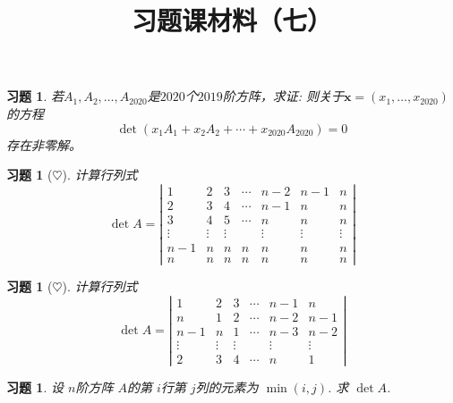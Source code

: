\documentclass[UTF8]{ctexart}
\newtheorem{ex}[thm]{习题}
\begin{document}
\title{习题课材料（七）}

\date{}

\maketitle

\vspace{-1cm}





\begin{ex}
若$A_1, A_2, \ldots, A_{2020}$是$2020$个$2019$阶方阵，求证: 则关于$\mathbf{x}=(x_1,\ldots ,x_{2020})$的方程$$\det \left(x_1A_1+x_2A_2+\cdots +x_{2020}A_{2020}\right)=0$$存在非零解。
\end{ex}

\begin{ex}[$\heartsuit $]
	计算行列式
$$\det A=\left|\begin{array}{ccccccc}
                 1 & 2 & 3 & \cdots & n-2 & n-1 & n \\
                 2 & 3 & 4 & \cdots & n-1 & n & n \\
                 3 & 4 & 5 & \cdots & n & n & n \\
                 \vdots & \vdots & \vdots &  & \vdots & \vdots & \vdots \\
                 n-1 & n & n & n & n & n & n \\
                 n & n & n & n & n & n & n
               \end{array}
\right|$$
\end{ex}



\begin{ex}[$\heartsuit $]
计算行列式
$$\det A=\left|\begin{array}{cccccc}
                 1 & 2 & 3 & \cdots & n-1 & n \\
                 n & 1 & 2 & \cdots & n-2 & n-1 \\
                 n-1 & n & 1 & \cdots & n-3 & n-2 \\
                 \vdots & \vdots & \vdots &  & \vdots & \vdots \\
                 2 & 3 & 4 & \cdots & n & 1
               \end{array}
\right|$$
\end{ex}


\begin{ex}
	设 $n$阶方阵 $A$的第 $i$行第 $j$列的元素为 $\min(i,j)$. 求 $\det A$.
\end{ex}
\end{document}
